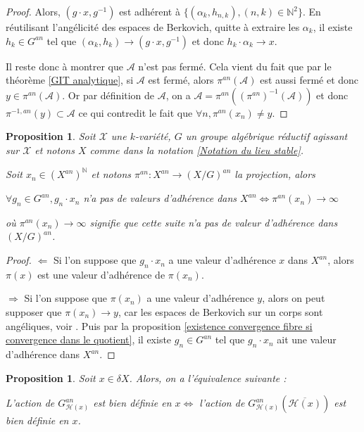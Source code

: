 \documentclass[11pt]{article}
\newcommand{\N}{\mathbb{N}}
\newtheorem{prop}[thm]{Proposition}
\begin{document}
\begin{proof}
Alors, $(g\cdot x, g^{-1})$ est adhérent à $\lbrace (\alpha_k, h_{n,k}), (n,k) \in \N^2\rbrace$. En réutilisant l'angélicité des espaces de Berkovich, quitte à extraire les $\alpha_k$, il existe $h_k \in G^{an}$ tel que $(\alpha_k, h_k) \rightarrow (g\cdot x, g^{-1})$ et donc $h_k\cdot \alpha_k \rightarrow x$.

Il reste donc à montrer que $\mathcal{A}$ n'est pas fermé. Cela vient du fait que par le théorème \ref{GIT analytique}, si $\mathcal{A}$ est fermé, alors $\pi^{an}(\mathcal{A})$ est aussi fermé et donc $y \in \pi^{an}(\mathcal{A})$. Or par définition de $\mathcal{A}$, on a $\mathcal{A} = \pi^{an}((\pi^{an})^{-1}(\mathcal{A}))$ et donc $\pi^{-1,an}(y) \subset \mathcal{A}$ ce qui contredit le fait que $\forall n, \pi^{an}(x_n) \neq y$.
\end{proof}

\begin{prop}\label{lien dégénéresnce quotient et valeur d adherence des fibres}
Soit $\mathcal{X}$ une $k$-variété, $G$ un groupe algébrique réductif agissant sur $\mathcal{X}$ et notons $X$ comme dans la notation \ref{Notation du lieu stable}.

Soit $x_n \in (X^{an})^\N$ et notons $\pi^{an} : X^{an} \rightarrow (X/G)^{an}$ la projection, alors
\begin{center}
$\forall g_n \in G^{an}, g_n\cdot x_n$ n'a pas de valeurs d'adhérence dans $X^{an} \iff \pi^{an}(x_n) \rightarrow \infty$
\end{center} 
où $\pi^{an}(x_n) \rightarrow \infty$ signifie que cette suite n'a pas de valeur d'adhérence dans $(X/G)^{an}$.
\end{prop}

\begin{proof}
$\Leftarrow$ Si l'on suppose que $g_n \cdot x_n$ a une valeur d'adhérence $x$ dans $X^{an}$, alors $\pi(x)$ est une valeur d'adhérence de $\pi(x_n)$.

$\Rightarrow$ Si l'on suppose que $\pi(x_n)$ a une valeur d'adhérence $y$, alors on peut supposer que $\pi(x_n) \rightarrow y$, car les espaces de Berkovich sur un corps sont angéliques, voir \cite{PoineauAngelique}. Puis par la proposition \ref{existence convergence fibre si convergence dans le quotient}, il existe $g_n \in G^{an}$ tel que $g_n\cdot x_n$ ait une valeur d'adhérence dans $X^{an}$.  
\end{proof}

\begin{prop}\label{Action bien definie suffit sur les points rigides}
Soit $x\in \delta X$. Alors, on a l'équivalence suivante :
\begin{center}
L'action de $G_{\mathcal{H}(x)}^{an}$ est bien définie en $x\iff$ l'action de $G^{an}_{\mathcal{H}(x)}(\overline{\mathcal{H}(x)})$ est bien définie en $x$.
\end{center}
\end{prop}
\end{document}
